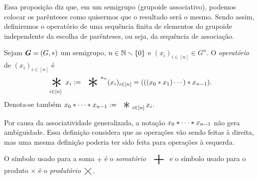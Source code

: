 Essa proposição diz que, em um semigrupo (grupoide associativo), podemos colocar os parênteses como quisermos que o resultado será o mesmo. Sendo assim, definiremos o operatório de uma sequência finita de elementos do grupoide independente da escolha de parênteses, ou seja, da sequência de associação.

\begin{definition}
Sejam $\bm G=(G,\ast)$ um semigrupo, $n \in \mathbb{N} \smallsetminus \{0\}$ e $(x_i)_{i \in [n]} \in G^n$. O \emph{operatório} de $(x_i)_{i \in [n]}$ é%
	\begin{equation*}
	\bigopb _{i \in [n]} x_i := \bigopb\nolimits^{a_n} (x_i)_{i \in [n]} = (((x_0 \opb x_1) \cdots ) \opb x_{n-1}).
	\end{equation*}
Denota-se também $x_0 \opb \cdots \opb x_{n-1} := \bigopb _{i \in [n]} x_i$.
\end{definition}

Por causa da associatividade generalizada, a notação $x_0 \ast \cdots \ast x_{n-1}$ não gera ambiguidade. Essa definição considera que as operações vão sendo feitas à direita, mas uma mesma definição poderia ter sido feita para operações à esquerda.%

O símbolo usado para a soma $+$ é o \emph{somatório} $\displaystyle\bigplus$ e o símbolo usado para o produto $\times$ é o \emph{produtório} $\displaystyle\bigtimes$.

